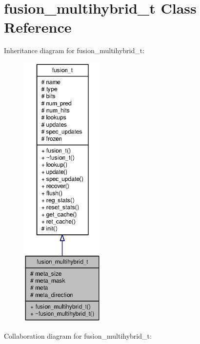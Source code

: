 \section{fusion\_\-multihybrid\_\-t Class Reference}
\label{classfusion__multihybrid__t}
Inheritance diagram for fusion\_\-multihybrid\_\-t:\nopagebreak
\begin{figure}[H]
\begin{center}
\leavevmode
\includegraphics[height=400pt]{classfusion__multihybrid__t__inherit__graph}
\end{center}
\end{figure}
Collaboration diagram for fusion\_\-multihybrid\_\-t:\nopagebreak
